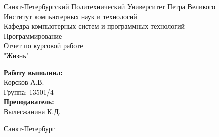 \documentclass[a4paper]{article}
\begin{document}


\begin{titlepage}	%

	\begin{center}		%

		\large Санкт-Петербургский Политехнический Университет Петра Великого\\
		\large Институт компьютерных наук и технологий \\
		\large Кафедра компьютерных систем и программных технологий\\[6cm]
		
		\huge Программирование\\[0.5cm] %
		\large Отчет по курсовой работе\\[0.1cm]
		\large "Жизнь"\\[5cm]

	\end{center}


	\begin{flushright} %
		\begin{minipage}{0.25\textwidth} %
			\begin{flushleft} %

				\large\textbf{Работу выполнил:}\\
				\large Корсков А.В.\\
				\large {Группа:} 13501/4\\
				
				\large \textbf{Преподаватель:}\\
				\large Вылегжанина К.Д.
				

			\end{flushleft}
		\end{minipage}
	\end{flushright}
	
	\vfill %

	\begin{center}
	\large Санкт-Петербург\\
	\large \the\year %
	\end{center} %

\thispagestyle{empty} %
\end{titlepage} %
\end{document}
